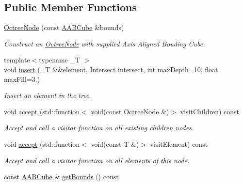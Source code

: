 \subsection*{Public Member Functions}
\begin{DoxyCompactItemize}
\item 
\hyperlink{classcpom_1_1_octree_node_af735078c73281cbb5132d61e8f2710bb}{Octree\+Node} (const \hyperlink{structcpom_1_1_a_a_b_cube}{A\+A\+B\+Cube} \&bounds)\hypertarget{classcpom_1_1_octree_node_af735078c73281cbb5132d61e8f2710bb}{}\label{classcpom_1_1_octree_node_af735078c73281cbb5132d61e8f2710bb}

\begin{DoxyCompactList}\small\item\em Construct an \hyperlink{classcpom_1_1_octree_node}{Octree\+Node} with supplied Axis Aligned Bouding Cube. \end{DoxyCompactList}\item 
{\footnotesize template$<$typename \+\_\+T $>$ }\\void \hyperlink{classcpom_1_1_octree_node_aee644d8c36868bc0482c98d3ce70a50d}{insert} (\+\_\+T \&\&element, Intersect intersect, int max\+Depth=10, float max\+Fill=3.)
\begin{DoxyCompactList}\small\item\em Insert an element in the tree. \end{DoxyCompactList}\item 
void \hyperlink{classcpom_1_1_octree_node_a9e324a04159c67c5a34ec6b61d9fecaa}{accept} (std\+::function$<$ void(const \hyperlink{classcpom_1_1_octree_node}{Octree\+Node} \&)$>$ visit\+Children) const \hypertarget{classcpom_1_1_octree_node_a9e324a04159c67c5a34ec6b61d9fecaa}{}\label{classcpom_1_1_octree_node_a9e324a04159c67c5a34ec6b61d9fecaa}

\begin{DoxyCompactList}\small\item\em Accept and call a visitor function on all existing children nodes. \end{DoxyCompactList}\item 
void \hyperlink{classcpom_1_1_octree_node_a17baf2ef35439d28996ed7359e7c79d1}{accept} (std\+::function$<$ void(const T \&)$>$ visit\+Element) const \hypertarget{classcpom_1_1_octree_node_a17baf2ef35439d28996ed7359e7c79d1}{}\label{classcpom_1_1_octree_node_a17baf2ef35439d28996ed7359e7c79d1}

\begin{DoxyCompactList}\small\item\em Accept and call a visitor function on all elements of this node. \end{DoxyCompactList}\item 
const \hyperlink{structcpom_1_1_a_a_b_cube}{A\+A\+B\+Cube} \& \hyperlink{classcpom_1_1_octree_node_a9a79ab665626c3c2a6f97aeabe3ff850}{get\+Bounds} () const \hypertarget{classcpom_1_1_octree_node_a9a79ab665626c3c2a6f97aeabe3ff850}{}\label{classcpom_1_1_octree_node_a9a79ab665626c3c2a6f97aeabe3ff850}


\end{DoxyCompactItemize}
